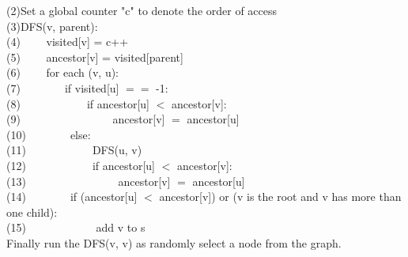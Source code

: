 \documentclass [11pt, a4paper, oneside] {article}
\begin{document}
(2)Set a global counter "c" to denote the order of access\\
(3)DFS(v, parent):\\
(4)$\qquad$ visited[v] = c++\\
(5)$\qquad$ ancestor[v] = visited[parent]\\
(6)$\qquad$ for each (v, u):\\
(7)$\qquad\qquad$if visited[u] $==$ -1:\\
(8)$\qquad\qquad\qquad$if ancestor[u] $<$ ancestor[v]:\\
(9)$\qquad\qquad\qquad\qquad$ ancestor[v] $=$ ancestor[u]\\
(10)$\qquad\qquad$else:\\
(11)$\qquad\qquad\qquad$DFS(u, v)\\
(12)$\qquad\qquad\qquad$if ancestor[u] $<$ ancestor[v]:\\
(13)$\qquad\qquad\qquad\qquad$ ancestor[v] $=$ ancestor[u]\\
(14)$\qquad\qquad$if (ancestor[u] $<$ ancestor[v]) or (v is the root and v has more than one child): \\
(15)$\qquad\qquad\qquad$ add v to s\\
Finally run the DFS(v, v) as randomly select a node from the graph.\\
\end{document}
